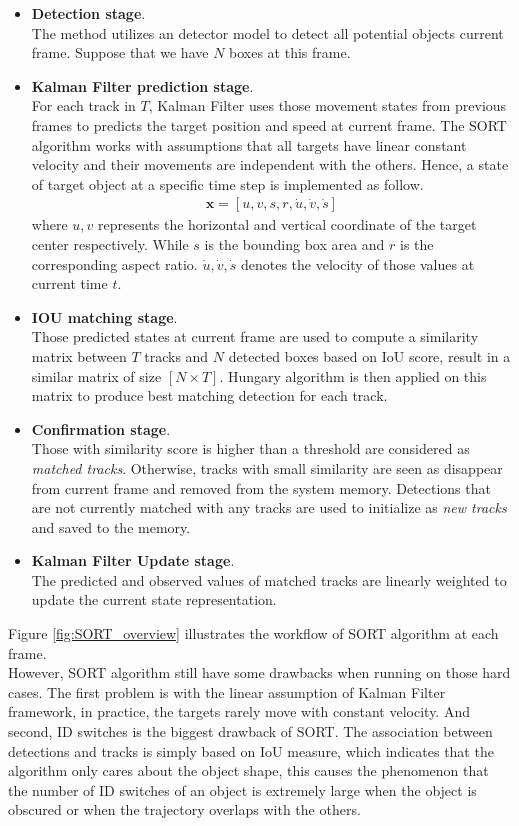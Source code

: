 \begin{itemize}
    \item \textbf{Detection stage}. \\
    The method utilizes an detector model to detect all potential objects current frame. Suppose that we have $N$ boxes at this frame.
    
    \item \textbf{Kalman Filter prediction stage}. \\
    For each track in $T$, Kalman Filter uses those movement states from previous frames to predicts the target position and speed at current frame. 
    The SORT algorithm works with assumptions that all targets have linear constant velocity and their movements are independent with the others. Hence, a state of target object at a specific time step is implemented as follow.
    \begin{align}
        \label{eqn:sort_kf}
        \mathbf{x} = [u,v,s,r,\dot{u},\dot{v},\dot{s}]
    \end{align}
    where $u, v$ represents the horizontal and vertical coordinate of the target center respectively. While $s$ is the bounding box area and $r$ is the corresponding aspect ratio. $\dot{u},\dot{v},\dot{s}$ denotes the velocity of those values at current time $t$.
    \item \textbf{IOU matching stage}. \\
    Those predicted states at current frame are used to compute a similarity matrix between $T$ tracks and $N$ detected boxes based on IoU score, result in a similar matrix of size $[N \times T]$. Hungary algorithm is then applied on this matrix to produce best matching detection for each track.
    \item \textbf{Confirmation stage}. \\
    Those with similarity score is higher than a threshold are considered as \textit{matched tracks}. Otherwise, tracks with small similarity are seen as disappear from current frame and removed from the system memory. Detections that are not currently matched with any tracks are used to initialize as \textit{new tracks} and saved to the memory.
    \item \textbf{Kalman Filter Update stage}. \\
    The predicted and observed values of matched tracks are linearly weighted to update the current state representation.
\end{itemize}
Figure \ref{fig:SORT_overview} illustrates the workflow of SORT algorithm at each frame.\\
However, SORT algorithm still have some drawbacks when running on those hard cases. The first problem is with the linear assumption of Kalman Filter framework, in practice, the targets rarely move with constant velocity.
And second, ID switches is the biggest drawback of SORT. The association between detections and tracks is simply based on IoU measure, which indicates that the algorithm only cares about the object shape, this causes the phenomenon that the number of ID switches of an object is extremely large when the object is obscured or when the trajectory overlaps with the others.

